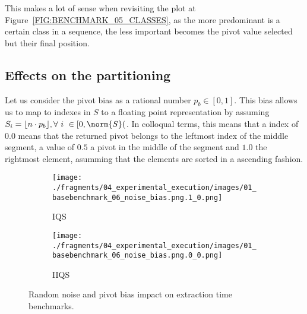 This makes a lot of sense when revisiting the plot at Figure~\ref{FIG:BENCHMARK_05_CLASSES}, as the more predominant is a certain class in a sequence, the less important becomes the pivot value selected but their final position.\\

\subsection{Effects on the partitioning}

Let us consider the pivot bias as a rational number $p_b \in [0,1]$. This bias allows us to map to indexes in $S$ to a floating point representation by assuming $S_i = \lfloor n\cdot p_{b}  \rfloor, \forall ~i~ \in[0,\norm{S}($. In colloqual terms, this means that a index of $0.0$ means that the returned pivot belongs to the leftmost index of the middle segment, a value of $0.5$ a pivot in the middle of the segment and $1.0$ the rightmost element, asumming that the elements are sorted in a ascending fashion.\\

\begin{figure}
    \centering
    \begin{subfigure}[b]{0.45\textwidth}
        \centering
        \texttt{[image: ./fragments/04\_experimental\_execution/images/01\_basebenchmark\_06\_noise\_bias.png.1\_0.png]}
        \caption{IQS}
        \label{FIG:BENCHMARK_06_NOISE_BIAS__0_0}
    \end{subfigure}
    \hfill
    \begin{subfigure}[b]{0.45\textwidth}
        \centering
        \texttt{[image: ./fragments/04\_experimental\_execution/images/01\_basebenchmark\_06\_noise\_bias.png.0\_0.png]}
        \caption{IIQS}
        \label{FIG:BENCHMARK_06_NOISE_BIAS__0_1}
    \end{subfigure}

    \caption{Random noise and pivot bias impact on extraction time benchmarks.}
    \label{FIG:BENCHMARK_06_NOISE_BIAS}
\end{figure}

